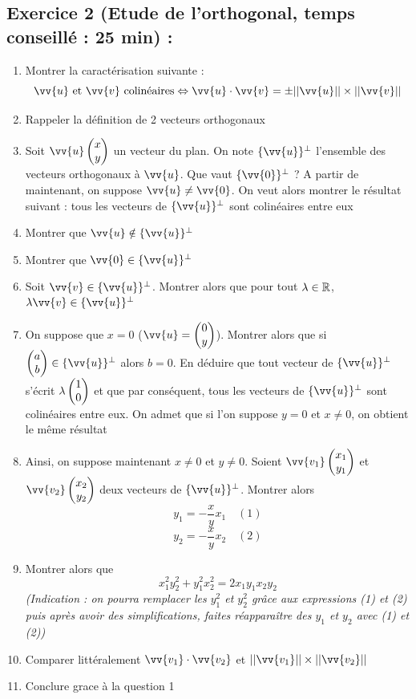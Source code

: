 \subsection*{Exercice 2 (Etude de l'orthogonal, temps conseillé : 25 min) : }
\begin{enumerate}
\item Montrer la caractérisation suivante : 
$$\vv{u} \text{ et } \vv{v} \text{ colinéaires} \Leftrightarrow \vv{u} \cdot \vv{v} = \pm ||\vv{u}|| \times ||\vv{v}||$$
\item Rappeler la définition de 2 vecteurs orthogonaux
\item Soit $\vv{u} \covec{x}{y}$ un vecteur du plan. On note $\{\vv{u}\}^\perp$ l'ensemble des vecteurs orthogonaux à $\vv{u}$. Que vaut $\{\vv{0}\}^\perp$ ? A partir de maintenant, on suppose $\vv{u} \neq \vv{0}$. On veut alors montrer le résultat suivant : tous les vecteurs de $\{\vv{u}\}^\perp$ sont colinéaires entre eux
\item Montrer que $\vv{u} \notin \{\vv{u}\}^\perp$
\item Montrer que $\vv{0} \in \{\vv{u}\}^\perp$
\item Soit $\vv{v} \in \{\vv{u}\}^\perp$. Montrer alors que pour tout $\lambda \in \mathbb{R}$, $\lambda \vv{v} \in \{\vv{u}\}^\perp$
\item On suppose que $x=0$ ($\vv{u} = \covec{0}{y}$). Montrer alors que si $\covec{a}{b} \in \{\vv{u}\}^\perp$ alors $b = 0$. En déduire que tout vecteur de $\{\vv{u}\}^\perp$ s'écrit $\lambda \begin{pmatrix}1 \\0 \end{pmatrix}$ et que par conséquent, tous les vecteurs de $\{\vv{u}\}^\perp$ sont colinéaires entre eux. On admet que si l'on suppose $y=0$ et $x\neq 0$, on obtient le même résultat
\item Ainsi, on suppose maintenant $x\neq 0$ et $y \neq 0$. Soient $\vv{v_1}\covec{x_1}{y_1}$ et $\vv{v_2}\covec{x_2}{y_2}$ deux vecteurs de $\{\vv{u}\}^\perp$. Montrer alors 
$$\boxed{y_1 = -\frac{x}{y}x_1} \quad (1)$$
$$\boxed{y_2 = -\frac{x}{y}x_2} \quad (2)$$
\item Montrer alors que 
$$x_1^2y_2^2 + y_1^2x_2^2 = 2x_1y_1x_2y_2$$
\emph{(Indication : on pourra remplacer les $y_1^2$ et $y_2^2$ grâce aux expressions (1) et (2) puis après avoir des simplifications, faites réapparaître des $y_1$ et $y_2$ avec (1) et (2))}
\item Comparer littéralement $\vv{v_1} \cdot \vv{v_2}$ et $||\vv{v_1}|| \times ||\vv{v_2}||$
\item Conclure grace à la question 1
\end{enumerate}
